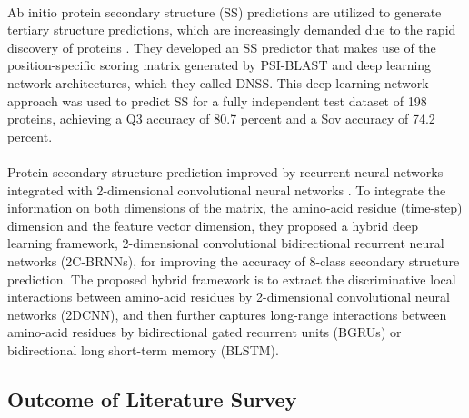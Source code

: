 \documentclass[12pt]{article}
\numberwithin{figure}{section}
\begin{document}
\paragraph{}
Ab initio protein secondary structure (SS) predictions are utilized to generate tertiary structure predictions, which are increasingly demanded due to the rapid discovery of proteins \cite{6}. They developed an SS predictor that makes use of the position-specific scoring matrix generated by PSI-BLAST and deep learning network architectures, which they called DNSS. This deep learning network approach was used to predict SS for a fully independent test dataset of 198 proteins, achieving a Q3 accuracy of 80.7 percent and a Sov accuracy of 74.2 percent.
\paragraph{}
Protein secondary structure prediction improved by recurrent neural networks integrated with 2-dimensional convolutional neural networks \cite{7}. To integrate the information on both dimensions of the matrix, the amino-acid residue (time-step) dimension and the feature vector dimension, they proposed a hybrid deep learning framework, 2-dimensional convolutional bidirectional recurrent neural networks (2C-BRNNs), for improving the accuracy of 8-class secondary structure prediction. The proposed hybrid framework is to extract the discriminative local interactions between amino-acid residues by 2-dimensional convolutional neural networks (2DCNN), and then further captures long-range interactions between amino-acid residues by bidirectional gated recurrent units (BGRUs) or bidirectional long short-term memory (BLSTM).
\clearpage
\subsection{Outcome of Literature Survey}
\end{document}
